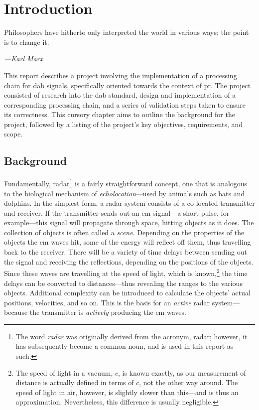 \documentclass[class=report,11pt,crop=false]{standalone}
\begin{document}
\chapter{Introduction}
\epigraph{Philosophers have hitherto only interpreted the world in various ways; the point is to change it.}%
    {\emph{---Karl Marx}}
\vspace{0.5cm}

This report describes a project involving the implementation of a processing chain for \gls{dab} signals, specifically oriented towards the context of \gls{pr}. The project consisted of research into the \gls{dab} standard, design and implementation of a corresponding processing chain, and a series of validation steps taken to ensure its correctness. This cursory chapter aims to outline the background for the project, followed by a listing of the project's key objectives, requirements, and scope.

\section{Background}
Fundamentally, radar\footnote{The word \emph{radar} was originally derived from the acronym, \acrlong{radar}; however, it has subsequently become a common noun, and is used in this report as such.} is a fairly straightforward concept, one that is analogous to the biological mechanism of \emph{echolocation}---used by animals such as bats and dolphins. In the simplest form, a radar system consists of a co-located transmitter and receiver. If the transmitter sends out an \gls{em} signal---a short pulse, for example---this signal will propagate through space, hitting objects as it does. The collection of objects is often called a \emph{scene}. Depending on the properties of the objects the \gls{em} waves hit, some of the energy will reflect off them, thus travelling back to the receiver. There will be a variety of time delays between sending out the signal and receiving the reflections, depending on the positions of the objects. Since these waves are travelling at the speed of light, which is known,\footnote{The speed of light in a vacuum, \(c\), is known exactly, as our measurement of distance is actually defined in terms of \(c\), not the other way around. The speed of light in air, however, is slightly slower than this---and is thus an approximation. Nevertheless, this difference is usually negligible.} the time delays can be converted to distances---thus revealing the ranges to the various objects. Additional complexity can be introduced to calculate the objects' actual positions, velocities, and so on. This is the basis for an \emph{active} radar system---because the transmitter is \emph{actively} producing the \gls{em} waves.
\end{document}
